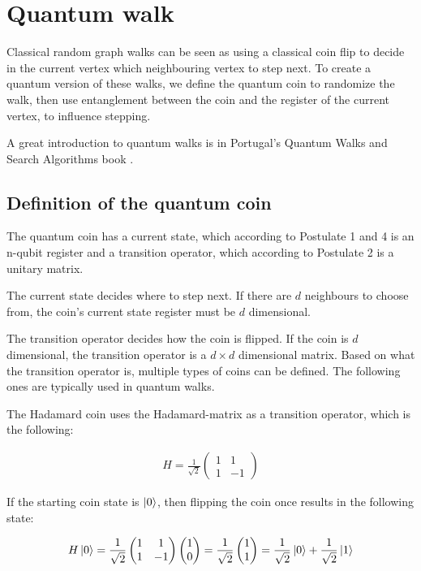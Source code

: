 \chapter{Quantum walk}

Classical random graph walks can be seen as using a classical coin flip to decide in the current vertex which neighbouring vertex to step next. To create a quantum version of these walks, we define the quantum coin to randomize the walk, then use entanglement between the coin and the register of the current vertex, to influence stepping.

A great introduction to quantum walks is in Portugal's Quantum Walks and Search Algorithms book \cite{Portugal}.

\section{Definition of the quantum coin}

The quantum coin has a current state, which according to Postulate 1 and 4 is an n-qubit register and a transition operator, which according to Postulate 2 is a unitary matrix.

The current state decides where to step next. If there are $d$ neighbours to choose from, the coin's current state register must be $d$ dimensional.

The transition operator decides how the coin is flipped. If the coin is $d$ dimensional, the transition operator is a $d\times{}d$ dimensional matrix. Based on what the transition operator is, multiple types of coins can be defined. The following ones are typically used in quantum walks.


The Hadamard coin uses the Hadamard-matrix as a transition operator, which is the following:

\begin{align}
  H = \frac{1}{\sqrt{2}}\begin{pmatrix}
      1 & 1  \\
      1 & -1
    \end{pmatrix}
\end{align}

If the starting coin state is $\ket{0}$, then flipping the coin once results in the following state:

\begin{align}
 H\ket{0} = \frac{1}{\sqrt{2}}\begin{pmatrix}
      1 & 1  \\
      1 & -1
    \end{pmatrix} \begin{pmatrix} 1 \\ 0 \end{pmatrix}
    = \frac{1}{\sqrt{2}} \begin{pmatrix} 1 \\ 1 \end{pmatrix} = \frac{1}{\sqrt{2}} \ket{0} + \frac{1}{\sqrt{2}} \ket{1}
\end{align}

